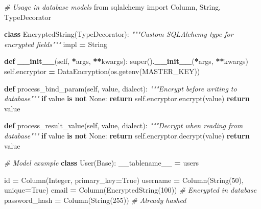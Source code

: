 \documentclass[
]{article}
\newenvironment{Shaded}{\begin{snugshade}}{\end{snugshade}}
\newcommand{\BuiltInTok}[1]{#1}
\newcommand{\CommentTok}[1]{\textcolor[rgb]{0.56,0.35,0.01}{\textit{#1}}}
\newcommand{\ControlFlowTok}[1]{\textcolor[rgb]{0.13,0.29,0.53}{\textbf{#1}}}
\newcommand{\DecValTok}[1]{\textcolor[rgb]{0.00,0.00,0.81}{#1}}
\newcommand{\FunctionTok}[1]{\textcolor[rgb]{0.13,0.29,0.53}{\textbf{#1}}}
\newcommand{\ImportTok}[1]{#1}
\newcommand{\KeywordTok}[1]{\textcolor[rgb]{0.13,0.29,0.53}{\textbf{#1}}}
\newcommand{\NormalTok}[1]{#1}
\newcommand{\OperatorTok}[1]{\textcolor[rgb]{0.81,0.36,0.00}{\textbf{#1}}}
\newcommand{\StringTok}[1]{\textcolor[rgb]{0.31,0.60,0.02}{#1}}
\newcommand{\VariableTok}[1]{\textcolor[rgb]{0.00,0.00,0.00}{#1}}
\begin{document}
\begin{Shaded}
\begin{Highlighting}[]
\CommentTok{\# Usage in database models}
\ImportTok{from}\NormalTok{ sqlalchemy }\ImportTok{import}\NormalTok{ Column, String, TypeDecorator}

\KeywordTok{class}\NormalTok{ EncryptedString(TypeDecorator):}
    \CommentTok{"""Custom SQLAlchemy type for encrypted fields"""}
\NormalTok{    impl }\OperatorTok{=}\NormalTok{ String}

    \KeywordTok{def} \FunctionTok{\_\_init\_\_}\NormalTok{(}\VariableTok{self}\NormalTok{, }\OperatorTok{*}\NormalTok{args, }\OperatorTok{**}\NormalTok{kwargs):}
        \BuiltInTok{super}\NormalTok{().}\FunctionTok{\_\_init\_\_}\NormalTok{(}\OperatorTok{*}\NormalTok{args, }\OperatorTok{**}\NormalTok{kwargs)}
        \VariableTok{self}\NormalTok{.encryptor }\OperatorTok{=}\NormalTok{ DataEncryption(os.getenv(}\StringTok{\textquotesingle{}MASTER\_KEY\textquotesingle{}}\NormalTok{))}

    \KeywordTok{def}\NormalTok{ process\_bind\_param(}\VariableTok{self}\NormalTok{, value, dialect):}
        \CommentTok{"""Encrypt before writing to database"""}
        \ControlFlowTok{if}\NormalTok{ value }\KeywordTok{is} \KeywordTok{not} \VariableTok{None}\NormalTok{:}
            \ControlFlowTok{return} \VariableTok{self}\NormalTok{.encryptor.encrypt(value)}
        \ControlFlowTok{return}\NormalTok{ value}

    \KeywordTok{def}\NormalTok{ process\_result\_value(}\VariableTok{self}\NormalTok{, value, dialect):}
        \CommentTok{"""Decrypt when reading from database"""}
        \ControlFlowTok{if}\NormalTok{ value }\KeywordTok{is} \KeywordTok{not} \VariableTok{None}\NormalTok{:}
            \ControlFlowTok{return} \VariableTok{self}\NormalTok{.encryptor.decrypt(value)}
        \ControlFlowTok{return}\NormalTok{ value}

\CommentTok{\# Model example}
\KeywordTok{class}\NormalTok{ User(Base):}
\NormalTok{    \_\_tablename\_\_ }\OperatorTok{=} \StringTok{\textquotesingle{}users\textquotesingle{}}

    \BuiltInTok{id} \OperatorTok{=}\NormalTok{ Column(Integer, primary\_key}\OperatorTok{=}\VariableTok{True}\NormalTok{)}
\NormalTok{    username }\OperatorTok{=}\NormalTok{ Column(String(}\DecValTok{50}\NormalTok{), unique}\OperatorTok{=}\VariableTok{True}\NormalTok{)}
\NormalTok{    email }\OperatorTok{=}\NormalTok{ Column(EncryptedString(}\DecValTok{100}\NormalTok{))  }\CommentTok{\# Encrypted in database}
\NormalTok{    password\_hash }\OperatorTok{=}\NormalTok{ Column(String(}\DecValTok{255}\NormalTok{))  }\CommentTok{\# Already hashed}
\end{Highlighting}
\end{Shaded}
\end{document}
